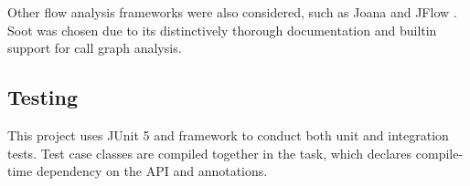Other flow analysis frameworks were also considered,
such as Joana \cite{joana} and JFlow \cite{jflow}.
Soot was chosen due to its distinctively thorough documentation
and builtin support for call graph analysis.

\subsection{Testing}
This project uses JUnit 5 and  framework
to conduct both unit and integration tests.
Test case classes are compiled together in the  task,
which declares compile-time dependency on the API  and  annotations.
